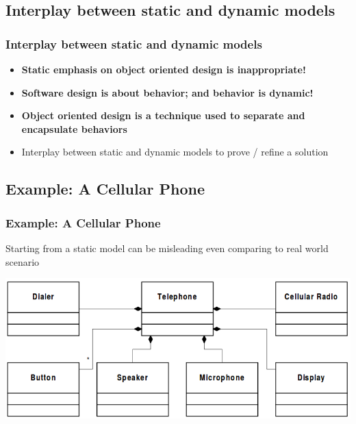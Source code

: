 \documentclass{beamer}
\begin{document}
\subsection{Interplay between static and dynamic models}
\begin{frame}
	\frametitle{Interplay between static and dynamic models}
	\begin{itemize}
  			\item<+-> \textbf{Static emphasis on object oriented design is inappropriate!}
  			\item<+-> \textbf{Software design is about behavior; and behavior is dynamic!}
  			\item<+-> \textbf{Object oriented design is a technique used to separate and encapsulate behaviors}
  			\item<+-> Interplay between static and dynamic models to prove / refine a solution
	\end{itemize}
\end{frame}

\subsection{Example: A Cellular Phone}
\begin{frame}
	\frametitle{Example: A Cellular Phone}
  		Starting from a static model can be misleading even comparing to real world scenario \\
  		\begin{center}
		\includegraphics[scale=0.38]{cellStatic}
		\end{center}
\end{frame}
\end{document}
